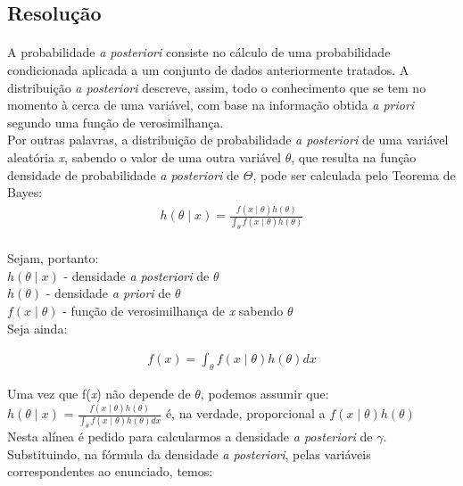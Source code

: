 \documentclass{article}
\begin{document}
			\subsection*{Resolução}
				\paragraph{}
					A probabilidade \textit{a posteriori} consiste no cálculo de uma probabilidade condicionada aplicada a um conjunto de dados anteriormente tratados. A distribuição \textit{a posteriori} descreve, assim, todo o conhecimento que se tem no momento à cerca de uma variável, com base na informação obtida \textit{a priori} segundo uma função de verosimilhança.\\
					Por outras palavras, a distribuição de probabilidade \textit{a posteriori} de uma variável aleatória \textit{x}, sabendo o valor de uma outra variável $\theta$, que resulta na função densidade de probabilidade \textit{a posteriori} de $\Theta$, pode ser calculada pelo Teorema de Bayes:
					\begin{align*}
						h(\theta\mid\textit{x}) = \frac { f(\textit{x}\mid\theta)  h(\theta) } { \int_{\theta}^{}  f(\textit{x}\mid\theta)  h(\theta) } \\
					\end{align*}	

					Sejam, portanto: \\
					\indent $h(\theta\mid\textit{x})$ - densidade \textit{a posteriori} de $\theta$ \\
					\indent $h(\theta)$ - densidade \textit{a priori} de $\theta$ \\
					\indent $f(\textit{x}\mid\theta)$ - função de verosimilhança de \textit{x} sabendo $\theta$ \\

					Seja ainda:
					
					\begin{align*}
						f(\textit{x}) =  \int_{\theta}^{}  f(\textit{x}\mid\theta)  h(\theta) dx
					\end{align*}

					Uma vez que f(\textit{x}) não depende de $\theta$, podemos assumir que: \\
					$h(\theta\mid\textit{x})$ = $\frac { f(\textit{x}\mid\theta)  h(\theta) } { \int_{\theta}^{}  f(\textit{x}\mid\theta)  h(\theta) dx }$ é, na verdade, proporcional a $f(\textit{x}\mid\theta)  h(\theta)$ \\

					Nesta alínea é pedido para calcularmos a densidade \textit{a posteriori} de $\gamma$. \\
					Substituindo, na fórmula da densidade \textit{a posteriori}, pelas variáveis correspondentes ao enunciado, temos: 
\end{document}

